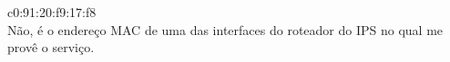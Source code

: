 \begin{solution}
    c0:91:20:f9:17:f8 \\
    Não, é o endereço MAC de uma das interfaces do roteador do IPS no qual me provê o serviço.
\end{solution}